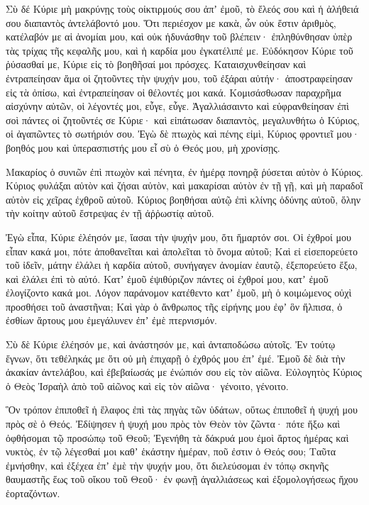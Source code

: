 \begin{spacing}{1.1}
\begin{multicols}{2}
Σὺ δέ Κύριε μὴ μακρύνῃς τοὺς οἰκτιρμούς σου ἀπʼ ἐμοῦ, τὸ ἔλεός σου καὶ ἡ ἀλήθειά σου διαπαντὸς ἀντελάβοντό μου.
Ὅτι περιέσχον με κακὰ, ὧν οὐκ ἔστιν ἀριθμὸς, κατέλαβόν με αἱ ἀνομίαι μου, καὶ οὐκ ἠδυνάσθην τοῦ βλέπειν· ἐπληθύνθησαν ὑπὲρ τὰς τρίχας τῆς κεφαλῆς μου, καὶ ἡ καρδία μου ἐγκατέλιπέ με.
Εὐδόκησον Κύριε τοῦ ῥύσασθαί με, Κύριε εἰς τὸ βοηθῆσαί μοι πρόσχες.
Καταισχυνθείησαν καὶ ἐντραπείησαν ἅμα οἱ ζητοῦντες τὴν ψυχήν μου, τοῦ ἐξάραι αὐτήν· ἀποστραφείησαν εἰς τὰ ὀπίσω, καὶ ἐντραπείησαν οἱ θέλοντές μοι κακά.
Κομισάσθωσαν παραχρῆμα αἰσχύνην αὐτῶν, οἱ λέγοντές μοι, εὖγε, εὖγε.
Ἀγαλλιάσαιντο καὶ εὐφρανθείησαν ἐπὶ σοὶ πάντες οἱ ζητοῦντές σε Κύριε· καὶ εἰπάτωσαν διαπαντὸς, μεγαλυνθήτω ὁ Κύριος, οἱ ἀγαπῶντες τὸ σωτήριόν σου.
Ἐγὼ δὲ πτωχὸς καὶ πένης εἰμὶ, Κύριος φροντιεῖ μου· βοηθός μου καὶ ὑπερασπιστής μου εἶ σὺ ὁ Θεός μου, μὴ χρονίσῃς.

Μακαρίος ὁ συνιῶν ἐπὶ πτωχὸν καὶ πένητα, ἐν ἡμέρᾳ πονηρᾷ ῥύσεται αὐτὸν ὁ Κύριος.
Κύριος φυλάξαι αὐτὸν καὶ ζήσαι αὐτὸν, καὶ μακαρίσαι αὐτὸν ἐν τῇ γῇ, καὶ μὴ παραδοῖ αὐτὸν εἰς χεῖρας ἐχθροῦ αὐτοῦ.
Κύριος βοηθήσαι αὐτῷ ἐπὶ κλίνης ὀδύνης αὐτοῦ, ὅλην τὴν κοίτην αὐτοῦ ἔστρεψας ἐν τῇ ἀῤῥωστίᾳ αὐτοῦ.

Ἐγὼ εἶπα, Κύριε ἐλέησόν με, ἴασαι τὴν ψυχήν μου, ὅτι ἥμαρτόν σοι.
Οἱ ἐχθροί μου εἶπαν κακά μοι, πότε ἀποθανεῖται καὶ ἀπολεῖται τὸ ὄνομα αὐτοῦ;
Καὶ εἰ εἰσεπορεύετο τοῦ ἰδεῖν, μάτην ἐλάλει ἡ καρδία αὐτοῦ, συνήγαγεν ἀνομίαν ἑαυτῷ, ἐξεπορεύετο ἔξω, καὶ ἐλάλει
ἐπὶ τὸ αὐτό. Κατʼ ἐμοῦ ἐψιθύριζον πάντες οἱ ἐχθροί μου, κατʼ ἐμοῦ ἐλογίζοντο κακά μοι.
Λόγον παράνομον κατέθεντο κατʼ ἐμοῦ, μὴ ὁ κοιμώμενος οὐχὶ προσθήσει τοῦ ἀναστῆναι;
Καὶ γὰρ ὁ ἄνθρωπος τῆς εἰρήνης μου ἐφʼ ὃν ἤλπισα, ὁ ἐσθίων ἄρτους μου ἐμεγάλυνεν ἐπʼ ἐμὲ πτερνισμόν.

Σὺ δὲ Κύριε ἐλέησόν με, καὶ ἀνάστησόν με, καὶ ἀνταποδώσω αὐτοῖς.
Ἐν τούτῳ ἔγνων, ὅτι τεθέληκάς με ὅτι οὐ μὴ ἐπιχαρῇ ὁ ἐχθρός μου ἐπʼ ἐμέ.
Ἐμοῦ δὲ διὰ τὴν ἀκακίαν ἀντελάβου, καὶ ἐβεβαίωσάς με ἐνώπιόν σου εἰς τὸν αἰῶνα.
Εὐλογητὸς Κύριος ὁ Θεὸς Ἰσραὴλ ἀπὸ τοῦ αἰῶνος καὶ εἰς τὸν αἰῶνα· γένοιτο, γένοιτο.

Ὃν τρόπον ἐπιποθεῖ ἡ ἔλαφος ἐπὶ τὰς πηγὰς τῶν ὑδάτων, οὕτως ἐπιποθεῖ ἡ ψυχή μου πρὸς σὲ ὁ Θεός.
Ἐδίψησεν ἡ ψυχή μου πρὸς τὸν Θεὸν τὸν ζῶντα· πότε ἥξω καὶ ὀφθήσομαι τῷ προσώπῳ τοῦ Θεοῦ;
Ἐγενήθη τὰ δάκρυά μου ἐμοὶ ἄρτος ἡμέρας καὶ νυκτὸς, ἐν τῷ λέγεσθαί μοι καθʼ ἑκάστην ἡμέραν, ποῦ ἐστιν ὁ Θεός σου;
Ταῦτα ἐμνήσθην, καὶ ἐξέχεα ἐπʼ ἐμὲ τὴν ψυχήν μου, ὅτι διελεύσομαι ἐν τόπῳ σκηνῆς θαυμαστῆς ἕως τοῦ οἴκου τοῦ Θεοῦ· ἐν φωνῇ ἀγαλλιάσεως καὶ ἐξομολογήσεως ἤχου ἑορταζόντων.


\end{multicols}
\end{spacing}
